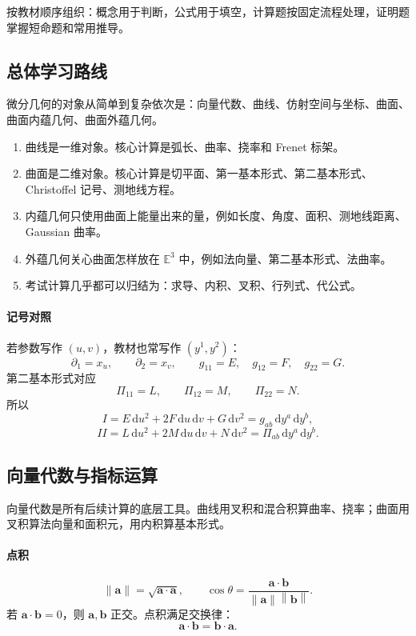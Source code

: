 \documentclass[UTF8,12pt,a4paper]{ctexart}
\newcommand{\E}{\mathbb E}
\newcommand{\dd}{\,\mathrm d}
\newcommand{\vct}[1]{\boldsymbol{#1}}
\newcommand{\norm}[1]{\left\lVert #1\right\rVert}
\begin{document}
按教材顺序组织：概念用于判断，公式用于填空，计算题按固定流程处理，证明题掌握短命题和常用推导。

\subsection{总体学习路线}

微分几何的对象从简单到复杂依次是：向量代数、曲线、仿射空间与坐标、曲面、曲面内蕴几何、曲面外蕴几何。

\begin{enumerate}
\item 曲线是一维对象。核心计算是弧长、曲率、挠率和 Frenet 标架。
\item 曲面是二维对象。核心计算是切平面、第一基本形式、第二基本形式、Christoffel 记号、测地线方程。
\item 内蕴几何只使用曲面上能量出来的量，例如长度、角度、面积、测地线距离、Gaussian 曲率。
\item 外蕴几何关心曲面怎样放在 $\E^3$ 中，例如法向量、第二基本形式、法曲率。
\item 考试计算几乎都可以归结为：求导、内积、叉积、行列式、代公式。
\end{enumerate}

\paragraph{记号对照}
若参数写作 $(u,v)$，教材也常写作 $(y^1,y^2)$：
\[
\partial_1=x_u,\qquad \partial_2=x_v,\qquad
g_{11}=E,\quad g_{12}=F,\quad g_{22}=G.
\]
第二基本形式对应
\[
\Pi_{11}=L,\qquad \Pi_{12}=M,\qquad \Pi_{22}=N.
\]
所以
\[
I=E\dd u^2+2F\dd u\dd v+G\dd v^2
=g_{ab}\dd y^a\dd y^b,
\]
\[
II=L\dd u^2+2M\dd u\dd v+N\dd v^2
=\Pi_{ab}\dd y^a\dd y^b.
\]

\subsection{向量代数与指标运算}

向量代数是所有后续计算的底层工具。曲线用叉积和混合积算曲率、挠率；曲面用叉积算法向量和面积元，用内积算基本形式。

\paragraph{点积}
\[
\norm{\vct a}=\sqrt{\vct a\cdot\vct a},\qquad
\cos\theta=\frac{\vct a\cdot\vct b}{\norm{\vct a}\norm{\vct b}}.
\]
若 $\vct a\cdot\vct b=0$，则 $\vct a,\vct b$ 正交。点积满足交换律：
\[
\vct a\cdot\vct b=\vct b\cdot\vct a.
\]
\end{document}
